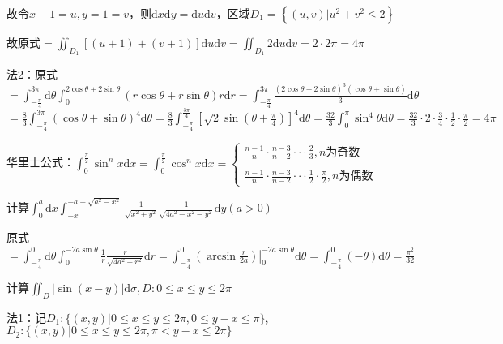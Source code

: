 \begin{xiti}
\begin{solution}
		故令$x-1=u, y=1=v$，则$\mathrm{d} x \mathrm{d} y=\mathrm{d} u \mathrm{d} v$，区域$D_{1}=\left\{(u, v) | u^{2}+v^{2} \leq 2\right\}$
		
		故原式$=\iint_{D_{1}}[(u+1)+(v+1)] \mathrm{d} u \mathrm{d} v=\iint_{D_{1}} 2 \mathrm{d} u \mathrm{d} v=2 \cdot 2 \pi=4 \pi$
		
		法2：原式$=\int_{-\frac{\pi}{4}}^{3 \pi} \mathrm{d} \theta \int_{0}^{2 \cos \theta+2 \sin \theta}(r \cos \theta+r \sin \theta) r \mathrm{d} r=\int_{-\frac{\pi}{4}}^{3 \pi} \frac{(2 \cos \theta+2 \sin \theta)^{3}(\cos \theta+\sin \theta)}{3} \mathrm{d} \theta$
		$=\frac{8}{3} \int_{-\frac{\pi}{4}}^{3 \pi}(\cos \theta+\sin \theta)^{4} \mathrm{d} \theta=\frac{8}{3} \int_{-\frac{\pi}{4}}^{\frac{3 \pi}{4}}\left[\sqrt{2} \sin \left(\theta+\frac{\pi}{4}\right)\right]^{4} \mathrm{d} \theta=\frac{32}{3} \int_{0}^{\pi} \sin ^{4} \theta \mathrm{d} \theta=\frac{32}{3} \cdot 2 \cdot \frac{3}{4} \cdot \frac{1}{2} \cdot \frac{\pi}{2}=4 \pi$
		
		\begin{conclusion}
			华里士公式：$\int_{0}^{\frac{\pi}{2}} \sin^{n} x \mathrm{d} x = \int_{0}^{\frac{\pi}{2}} \cos^{n} x \mathrm{d} x = \left\{\begin{array}{l}{\frac{n-1}{n} \cdot \frac{n-3}{n-2} \cdot \cdot \cdot \frac{2}{3} , n  \text{为奇数}} \\\\ {\frac{n-1}{n} \cdot \frac{n-3}{n-2} \cdot \cdot \cdot \frac{1}{2} \cdot \frac{\pi}{2} , n \text{为偶数}}\end{array}\right.$
		\end{conclusion}
	\end{solution}
	\item 计算$\int_{0}^{a} \mathrm{d} x \int_{-x}^{-a+\sqrt{a^{2}-x^{2}}} \frac{1}{\sqrt{x^{2}+y^{2}}} \frac{1}{\sqrt{4 a^{2}-x^{2}-y^{2}}} \mathrm{d} y (a>0)$
	\begin{solution}
		原式$=\int_{-\frac{\pi}{4}}^{0} \mathrm{d} \theta \int_{0}^{-2 a \sin \theta} \frac{1}{r} \frac{r}{\sqrt{4 a^{2}-r^{2}}} \mathrm{d} r=\int_{-\frac{\pi}{4}}^{0}\left.\left(\arcsin \frac{r}{2 a}\right)\right|_{0} ^{-2 a \sin \theta} \mathrm{d} \theta=\int_{-\frac{\pi}{4}}^{0}(-\theta) \mathrm{d} \theta=\frac{\pi^{2}}{32}$
	\end{solution}
	\item 计算$\iint_{D} |\sin (x-y) | \mathrm{d} \sigma, D : 0 \leqslant x \leqslant y \leqslant 2 \pi$
	\begin{solution}
		法1：记$D_{1} :\{(x, y) | 0 \leq x \leq y \leq 2 \pi, 0 \leq y-x \leq \pi\}$,$D_{2} :\{(x, y) | 0 \leq x \leq y \leq 2 \pi, \pi<y-x \leq 2 \pi\}$
		

\end{solution}
\end{xiti}
